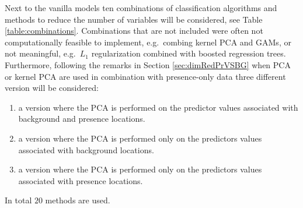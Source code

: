 Next to the vanilla models ten combinations of classification algorithms and methods to reduce the number of variables will be considered, see Table \ref{table:combinations}. Combinations that are not included were often not computationally feasible to implement, e.g.\ combing kernel PCA and GAMs, or not meaningful, e.g.\ $L_1$ regularization combined with boosted regression trees. Furthermore, following the remarks in Section \ref{sec:dimRedPrVSBG} when PCA or kernel PCA are used in combination with presence-only data three different version will be considered: \begin{enumerate}
\item a version where the PCA is performed on the predictor values associated with background and presence locations.
\item a version where the PCA is performed only on the predictors values associated with background locations.
\item a version where the PCA is performed only on the predictors values associated with presence locations.
\end{enumerate}
In total $20$ methods are used.


\begin{table}[!htb]
\caption{\label{table:combinations}Table with the combinations of classification and dimensionality reduction techniques that are considered.}
\end{table}